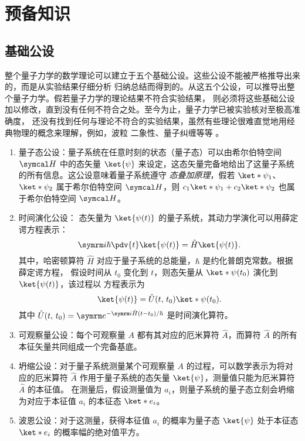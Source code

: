 \chapter{预备知识}



\section{基础公设}

整个量子力学的数学理论可以建立于五个基础公设。这些公设不能被严格推导出来的，而是从实验结果仔细分析
归纳总结而得到的。从这五个公设，可以推导出整个量子力学。假若量子力学的理论结果不符合实验结果，
则必须将这些基础公设加以修改，直到没有任何不符合之处。至今为止，量子力学已被实验核对至极高准确度，
还没有找到任何与理论不符合的实验结果，虽然有些理论很难直觉地用经典物理的概念来理解，例如，波粒
二象性、量子纠缠等等 \parencite{zurek2014quantum,cohen2013claude,zettili2003quantum}。

\begin{enumerate}
  \item 量子态公设：量子系统在任意时刻的状态（量子态）可以由希尔伯特空间 $\hilbertH$ 中的态矢量
    $\ket{\psi}$ 来设定，这态矢量完备地给出了这量子系统的所有信息。这公设意味着量子系统遵守%
    \emph{态叠加原理}，假若 $\ket*{\psi_1}$、$\ket*{\psi_2}$ 属于希尔伯特空间 $\hilbertH$，则
    $c_1\ket*{\psi_1} + c_2\ket*{\psi_2}$ 也属于希尔伯特空间 $\hilbertH$。
  \item 时间演化公设： 态矢量为 $\ket{\psi(t)}$ 的量子系统，其动力学演化可以用薛定谔方程表示：
    \begin{equation}
      \upi\hbar \pdv{t} \ket{\psi(t)} = \hat{H} \ket{\psi(t)}.
    \end{equation}
    其中，哈密顿算符 $\hat{H}$ 对应于量子系统的总能量，$\hbar$ 是约化普朗克常数。根据薛定谔方程，
    假设时间从 $t_0$ 变化到 $t$，则态矢量从 $\ket*{\psi(t_0)}$ 演化到 $\ket{\psi(t)}$，该过程以
    方程表示为
    \begin{equation}
      \ket{\psi(t)} = \hat{U}(t,\,t_0) \ket*{\psi(t_0)}.
    \end{equation}
    其中 $\hat{U}(t,\,t_0) = \upe^{-\upi\hat{H}(t-t_0) / \hbar}$ 是时间演化算符。
  \item 可观察量公设：每个可观察量 $A$ 都有其对应的厄米算符 $\hat{A}$，而算符 $\hat{A}$ 的所有
    本征矢量共同组成一个完备基底。
  \item 坍缩公设：对于量子系统测量某个可观察量 $A$ 的过程，可以数学表示为将对应的厄米算符
    $\hat{A}$ 作用于量子系统的态矢量 $\ket{\psi}$，测量值只能为厄米算符 $\hat{A}$ 的本征值。
    在测量后，假设测量值为 $a_i$，则量子系统的量子态立刻会坍缩为对应于本征值 $a_i$ 的本征态
    $\ket*{e_i}$。
  \item 波恩公设：对于这测量，获得本征值 $a_i$ 的概率为量子态 $\ket{\psi}$ 处于本征态 $\ket*{e_i}$
    的概率幅的绝对值平方。
\end{enumerate}



